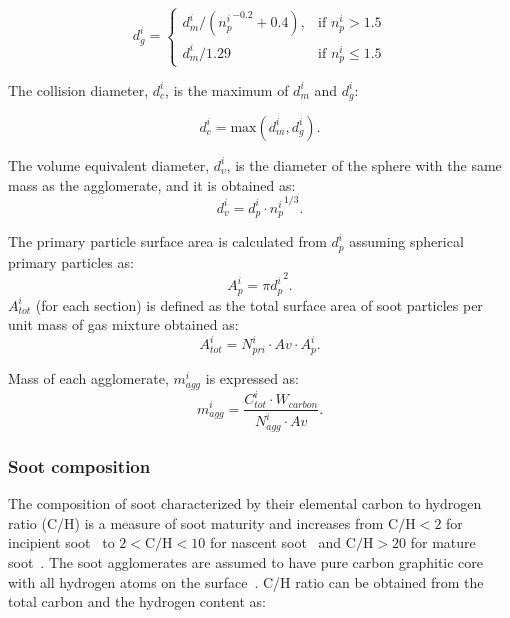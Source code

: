 \begin{equation}
	d^i_g = 
	\left\{
	\begin{array}{lr}
		d^i_m/({n^i_p}^{-0.2}+0.4), & \text{if } n^i_p > 1.5\\
		d^i_m/1.29 & \text{if } n^i_p\leq 1.5
	\end{array}
	\right.
	\label{eqn:d_g}
\end{equation}

The collision diameter, ${d^i_c}$, is the maximum of ${d^i_{m}}$ and ${d^i_{g}}$:

\begin{equation}
	d^i_c = \mathrm{max}\left(d^i_m, d^i_g\right).
	\label{eqn:d_c}
\end{equation}

The volume equivalent diameter, $d^i_v$, is the diameter of the sphere with the same mass as the agglomerate, and it is obtained as:
\begin{equation}
	d^i_v = d^i_p \cdot {n^i_p}^{1/3}.
	\label{eqn:d_v}
\end{equation}

The primary particle surface area is calculated from ${d^i_p}$ assuming spherical primary particles as:
\begin{equation}
	A^i_{p} = \pi {d^i_p}^2.
	\label{eqn:Ap}
\end{equation}
$A^i_{tot}$ (for each section) is defined as the total surface area of soot particles per unit mass of gas mixture obtained as:
\begin{equation}
	A^i_{tot} = N^i_{pri}\cdot Av\cdot A^i_{p}
	\label{eqn:Atot}.
\end{equation}

Mass of each agglomerate, $m^i_{agg}$ is expressed as:
\begin{equation}
	m^i_{agg} = \frac{C^i_{tot}\cdot W_{carbon}}{N^i_{agg}\cdot Av}.
	\label{eqn:m_agg}
\end{equation}


\subsubsection{Soot composition}
\label{sec:sootcomp}
The composition of soot characterized by their elemental carbon to hydrogen ratio (C/H) is a measure of soot maturity and increases from $\mathrm{C/H<2}$ for incipient soot~\citep{ciajolo1998spectroscopic} to $\mathrm{2<C/H<10}$ for nascent soot~\citep{betrancourt2017investigation} and $\mathrm{C/H>20}$ for mature soot~\citep{michelsen2017probing}. The soot agglomerates are assumed to have pure carbon graphitic core~\citep{kholghy2016core} with all hydrogen atoms on the surface~\citep{blanquart2009analyzing}. C/H ratio can be obtained from the total carbon and the hydrogen content as:

